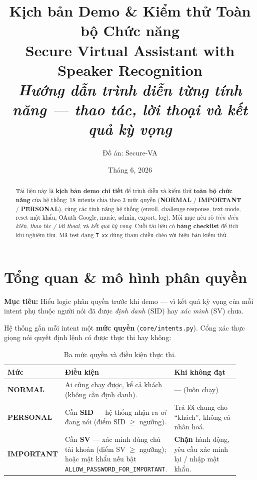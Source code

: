 \documentclass[12pt,a4paper]{article}
\title{\textbf{Kịch bản Demo \& Kiểm thử Toàn bộ Chức năng}\\[3pt]
\large Secure Virtual Assistant with Speaker Recognition\\
\large \textit{Hướng dẫn trình diễn từng tính năng --- thao tác, lời thoại và kết quả kỳ vọng}}
\author{Đồ án: Secure-VA}
\date{Tháng 6, 2026}
\newcommand{\role}[1]{\par\smallskip\noindent\textbf{\textcolor{hdr}{Mục tiêu:}} #1\par\smallskip}
\newcommand{\nrm}{\textcolor{normalc}{\textbf{NORMAL}}}
\newcommand{\imp}{\textcolor{importantc}{\textbf{IMPORTANT}}}
\newcommand{\per}{\textcolor{personalc}{\textbf{PERSONAL}}}
\begin{document}
\maketitle

\begin{abstract}
\noindent Tài liệu này là \textbf{kịch bản demo chi tiết} để trình diễn và kiểm
thử \textbf{toàn bộ chức năng} của hệ thống: 18 intents chia theo 3 mức quyền
(\nrm{} / \imp{} / \per{}), cùng các tính năng hệ thống (enroll, challenge-response,
text-mode, reset mật khẩu, OAuth Google, music, admin, export, log). Mỗi mục nêu
rõ \emph{tiền điều kiện}, \emph{thao tác / lời thoại}, và \emph{kết quả kỳ vọng}.
Cuối tài liệu có \textbf{bảng checklist} để tích khi nghiệm thu. Mã test dạng
\texttt{T-xx} dùng tham chiếu chéo với biên bản kiểm thử.
\end{abstract}

\tableofcontents
\newpage

\section{Tổng quan \& mô hình phân quyền}
\role{Hiểu logic phân quyền trước khi demo --- vì kết quả kỳ vọng của mỗi intent
phụ thuộc người nói đã được \emph{định danh} (SID) hay \emph{xác minh} (SV) chưa.}

Hệ thống gắn mỗi intent một \textbf{mức quyền} (\texttt{core/intents.py}). Cổng
xác thực giọng nói quyết định lệnh có được thực thi hay không:

\begin{table}[H]
\centering
\caption{Ba mức quyền và điều kiện thực thi.}
\small
\begin{tabular}{p{0.16\linewidth}p{0.40\linewidth}p{0.36\linewidth}}
\toprule
\textbf{Mức} & \textbf{Điều kiện} & \textbf{Khi không đạt} \\
\midrule
\nrm{} & Ai cũng chạy được, kể cả khách (không cần định danh). & --- (luôn chạy) \\
\per{} & Cần \textbf{SID} --- hệ thống nhận ra \emph{ai} đang nói (điểm SID
$\geq$ ngưỡng). & Trả lời chung cho ``khách'', không cá nhân hoá. \\
\imp{} & Cần \textbf{SV} --- xác minh đúng chủ tài khoản (điểm SV $\geq$ ngưỡng);
hoặc mật khẩu nếu bật \texttt{ALLOW\_PASSWORD\_FOR\_IMPORTANT}. & \textbf{Chặn}
hành động, yêu cầu xác minh lại / nhập mật khẩu. \\
\bottomrule
\end{tabular}
\end{table}
\end{document}
